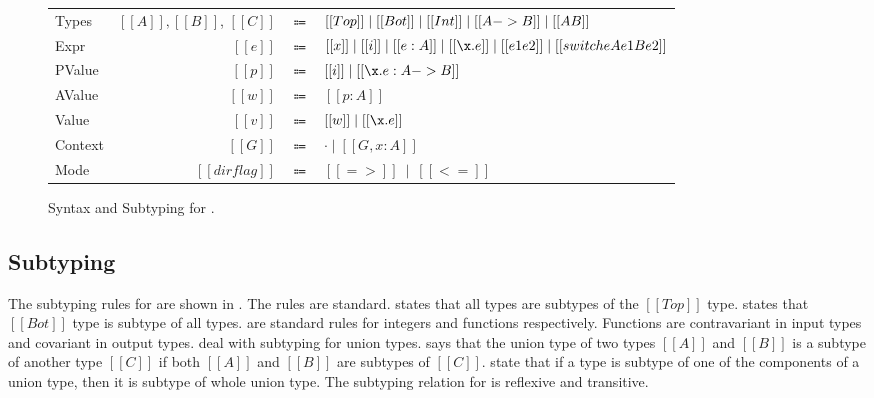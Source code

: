 \begin{figure}[t]
  \begin{small}
    \centering
    \begin{tabular}{lrcl} \toprule
      Types & $[[A]], [[B]]$, $[[C]]$ & $\Coloneqq$ & $ [[Top]] \mid [[Bot]] \mid [[Int]] \mid [[A -> B]] \mid [[A \/ B]] $ \\
      Expr & $[[e]]$ & $\Coloneqq$ & $[[x]] \mid [[i]] \mid [[e:A]] \mid [[\x.e]] \mid [[e1 e2]] \mid [[switch e A e1 B e2]]$\\
      PValue & $[[p]]$ & $\Coloneqq$ & $[[i]] \mid [[\x.e : A -> B]] $\\
      AValue & $[[w]]$ & $\Coloneqq$ & $[[p:A]]$\\
      Value & $[[v]]$ & $\Coloneqq$ & $[[w]] \mid [[\x.e]] $\\
      Context & $[[G]]$ & $\Coloneqq$ & $ \cdot \mid [[G , x : A]]$ \\
      Mode & $[[dirflag]]$ & $\Coloneqq$ & $[[=>]] \ \mid \ [[<=]]$ \\
      \bottomrule
    \end{tabular}
  \end{small}
  \begin{small}
    \centering
  \end{small}
  \caption{Syntax and Subtyping for \cal.}
  \label{fig:union:syntax}
\end{figure}

\subsection{Subtyping}
\label{sec:union:sub}
The subtyping rules for \cal are shown in
. The rules are standard.
 states that all types are subtypes of
the $[[Top]]$ type.  states that $[[Bot]]$ type is subtype of
all types.  are standard rules for integers and
functions respectively.  Functions are contravariant in input types
and covariant in output types.  deal with
subtyping for union types.  says that the union type of two types $[[A]]$ and $[[B]]$
is a subtype of another type $[[C]]$ if both $[[A]]$ and $[[B]]$ are subtypes of
$[[C]]$.  state that if a
type is subtype of one of the components of a union type, then it is subtype of whole
union type.
The subtyping relation for \cal is reflexive and transitive.

